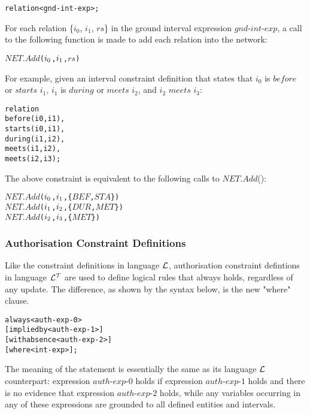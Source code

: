 \documentclass[11pt]{report}
\newenvironment{vverbatim}
{
  \begin{alltt}
}
{
  \vspace{-\baselineskip}
  \end{alltt}
}
\begin{document}
          \begin{vverbatim}
  relation <gnd-int-exp>;
          \end{vverbatim}

          For each relation \{$i_0$, $i_1$, $rs$\} in the ground interval
          expression $gnd$-$int$-$exp$, a call to the following function is 
          made to add each relation into the network:

          \begin{vverbatim}
  \(NET.Add\)(\(i\sb{0}\), \(i\sb{1}\), \(rs\))
          \end{vverbatim}

          For example, given an interval constraint definition that states
          that $i_0$ is $before$ or $starts$ $i_1$, $i_1$ is $during$ or
          $meets$ $i_2$, and $i_2$ $meets$ $i_3$:

          \begin{vverbatim}
  relation
    before(i0, i1),
    starts(i0, i1),
    during(i1, i2),
    meets(i1, i2),
    meets(i2, i3);
          \end{vverbatim}

          \noindent
          The above constraint is equivalent to the following calls to
          $NET.Add$():

          \begin{vverbatim}
  \(NET.Add\)(\(i\sb{0}\), \(i\sb{1}\), \{\(BEF\), \(STA\)\})
  \(NET.Add\)(\(i\sb{1}\), \(i\sb{2}\), \{\(DUR\), \(MET\)\})
  \(NET.Add\)(\(i\sb{2}\), \(i\sb{3}\), \{\(MET\)\})
          \end{vverbatim}

        \subsubsection{Authorisation Constraint Definitions}

          Like the constraint definitions in language ${\cal L}$, authorisation
          constraint defintions in language ${\cal L^T}$ are used to define
          logical rules that always holds, regardless of any update. The
          difference, as shown by the syntax below, is the new "where" clause.

          \begin{vverbatim}
  always <auth-exp-0>
    [implied by <auth-exp-1>]
    [with absence <auth-exp-2>]
    [where <int-exp>];
          \end{vverbatim}

          The meaning of the statement is essentially the same as its language
          ${\cal L}$ counterpart: expression $auth$-$exp$-$0$ holds if
          expression $auth$-$exp$-$1$ holds and there is no evidence that
          expression $auth$-$exp$-$2$ holds, while any variables occurring in
          any of these expressions are grounded to all defined entities and
          intervals.
\end{document}
